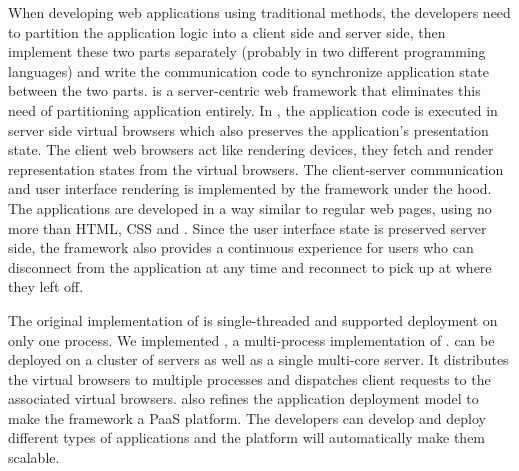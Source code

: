 \documentclass[12pt]{report}
\begin{document}
When developing web applications using traditional methods, the developers
need to partition the application logic into a client side and server side,
then implement these two parts separately (probably in two different
programming languages) and write the communication code to synchronize
application state between the two parts. \cb is a server-centric web
framework that eliminates this need of partitioning application entirely. In
\cb, the application code is executed in server side virtual browsers
which also preserves the application's presentation state. The client web
browsers act like rendering devices, they fetch and render representation
states from the virtual browsers. The client-server communication and user
interface rendering is implemented by the framework under the hood. The
applications are developed in a way similar to regular web pages, using no
more than HTML, CSS and \js. Since the user interface state is
preserved server side, the framework also provides a continuous experience for
users who can disconnect from the application at any time and reconnect to
pick up at where they left off.

The original implementation of \cb is single-threaded  and supported
deployment on only one process. We implemented \cbtwo, a multi-process
implementation of \cb. \cbtwo can be deployed on a cluster of servers as well
as a single multi-core server. It distributes the virtual browsers to multiple
processes and  dispatches client requests to the associated virtual browsers.
\cbtwo also refines the \cb application deployment model to make the framework
a PaaS platform. The developers can develop and deploy different types of
applications and the platform will automatically make them scalable.



\end{document}
